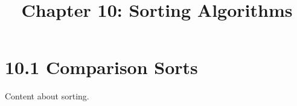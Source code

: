 \documentclass{article}
\title{Chapter 10: Sorting Algorithms}
\begin{document}
\section{10.1 Comparison Sorts}
Content about sorting.
\end{document}
